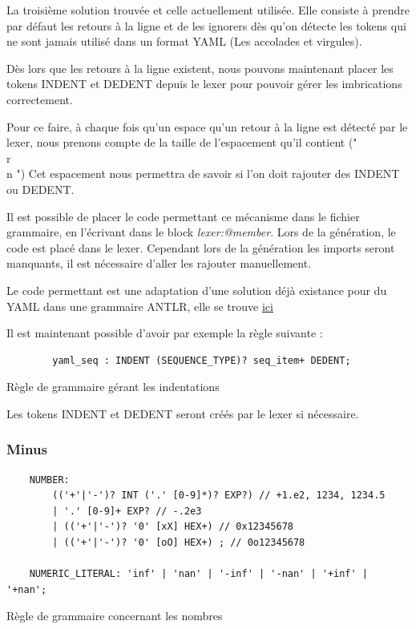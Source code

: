 \documentclass[
    iict, %
    il, %
]{heig-tb}
\begin{document}
La troisième solution trouvée et celle actuellement utilisée. Elle consiste à prendre par défaut les retours à la ligne et de les ignorers dès qu'on détecte les tokens
qui ne sont jamais utilisé dans un format YAML (Les accolades et virgules).

Dès lors que les retours à la ligne existent, nous pouvons maintenant placer les tokens INDENT et DEDENT depuis le lexer
pour pouvoir gérer les imbrications correctement.

Pour ce faire, à chaque fois qu'un espace qu'un retour à la ligne est détecté par le lexer, nous prenons compte de la taille de l'espacement qu'il contient ("\\r\\n    ")
Cet espacement nous permettra de savoir si l'on doit rajouter des INDENT ou DEDENT.

Il est possible de placer le code permettant ce mécanisme dans le fichier grammaire, en l'écrivant dans le block \emph{lexer:@member{}}.
Lors de la génération, le code est placé dans le lexer. Cependant lors de la génération les imports seront manquants, il est nécessaire d'aller les rajouter manuellement.

Le code permettant est une adaptation d'une solution déjà existance pour du YAML dans une grammaire ANTLR, elle se trouve \href{https://github.com/umaranis/FastYaml}{ici}

Il est maintenant possible d'avoir par exemple la règle suivante :

\begin{listing}[!ht]
    \begin{verbatim}
        yaml_seq : INDENT (SEQUENCE_TYPE)? seq_item+ DEDENT;
    \end{verbatim}
    \caption{Règle de grammaire gérant les indentations}
    \label{ex-indentation-rule}
\end{listing}

Les tokens INDENT et DEDENT seront créés par le lexer si nécessaire.

\subsubsection{Minus}

\begin{listing}[!ht]
    \begin{verbatim}
    NUMBER:
        (('+'|'-')? INT ('.' [0-9]*)? EXP?) // +1.e2, 1234, 1234.5
        | '.' [0-9]+ EXP? // -.2e3
        | (('+'|'-')? '0' [xX] HEX+) // 0x12345678
        | (('+'|'-')? '0' [oO] HEX+) ; // 0o12345678

    NUMERIC_LITERAL: 'inf' | 'nan' | '-inf' | '-nan' | '+inf' | '+nan';
    \end{verbatim}
    \caption{Règle de grammaire concernant les nombres}
    \label{number-rule}
\end{listing}
\end{document}
